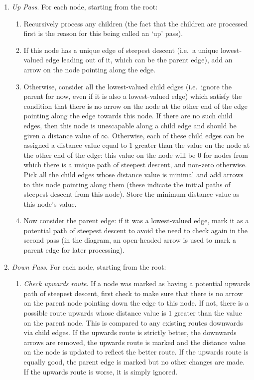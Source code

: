 \begin{enumerate}

\item \emph{Up Pass}. For each node, starting from the root:

\begin{enumerate}

\item Recursively process any children (the fact that the children are processed first is the reason for this being called an `up' pass).

\item If this node has a unique edge of steepest descent (i.e.~a unique lowest-valued edge leading out of it, which can be the parent edge), add an arrow on the node pointing along the edge.

\item Otherwise, consider all the lowest-valued child edges (i.e.~ignore the parent for now, even if it is also a lowest-valued edge) which satisfy the condition that there is no arrow on the node at the other end of the edge pointing along the edge towards this node. If there are no such child edges, then this node is unescapable along a child edge and should be given a distance value of $\infty$. Otherwise, each of these child edges can be assigned a distance value equal to $1$ greater than the value on the node at the other end of the edge: this value on the node will be $0$ for nodes from which there is a unique path of steepest descent, and non-zero otherwise. Pick all the child edges whose distance value is minimal and add arrows to this node pointing along them (these indicate the initial paths of steepest descent from this node). Store the minimum distance value as this node's value.

\item Now consider the parent edge: if it was a lowest-valued edge, mark it as a potential path of steepest descent to avoid the need to check again in the second pass (in the diagram, an open-headed arrow is used to mark a parent edge for later processing).

\end{enumerate}

\item \emph{Down Pass}. For each node, starting from the root:

\begin{enumerate}

\item \emph{Check upwards route}. If a node was marked as having a potential upwards path of steepest descent, first check to make sure that there is no arrow on the parent node pointing down the edge to this node. If not, there is a possible route upwards whose distance value is $1$ greater than the value on the parent node. This is compared to any existing routes downwards via child edges. If the upwards route is strictly better, the downwards arrows are removed, the upwards route is marked and the distance value on the node is updated to reflect the better route. If the upwards route is equally good, the parent edge is marked but no other changes are made. If the upwards route is worse, it is simply ignored.


\end{enumerate}
\end{enumerate}

